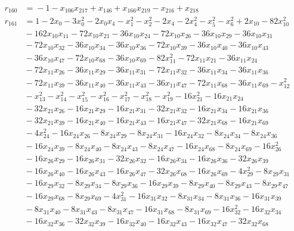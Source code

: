 \begin{align*}
r_{160} &={}-1 -x_{106}x_{217} +x_{146} +x_{166}x_{219} -x_{216} +x_{218} \\
r_{161} &={}1 -2x_{0} -3x_{0}^{2} -2x_{0}x_{4} -x_{1}^{2} -x_{2}^{2} -2x_{4} -2x_{4}^{2} -x_{5}^{2} -x_{6}^{2} +2x_{10} -82x_{10}^{2} \\
&{}-162x_{10}x_{11} -72x_{10}x_{21} -36x_{10}x_{24} -72x_{10}x_{26} -36x_{10}x_{29} -36x_{10}x_{31} \\
&{}-72x_{10}x_{32} -36x_{10}x_{34} -36x_{10}x_{36} -72x_{10}x_{39} -36x_{10}x_{40} -36x_{10}x_{43} \\
&{}-36x_{10}x_{47} -72x_{10}x_{68} -36x_{10}x_{69} -82x_{11}^{2} -72x_{11}x_{21} -36x_{11}x_{24} \\
&{}-72x_{11}x_{26} -36x_{11}x_{29} -36x_{11}x_{31} -72x_{11}x_{32} -36x_{11}x_{34} -36x_{11}x_{36} \\
&{}-72x_{11}x_{39} -36x_{11}x_{40} -36x_{11}x_{43} -36x_{11}x_{47} -72x_{11}x_{68} -36x_{11}x_{69} -x_{12}^{2} \\
&{}-x_{13}^{2} -x_{14}^{2} -x_{15}^{2} -x_{16}^{2} -x_{17}^{2} -x_{18}^{2} -x_{19}^{2} -16x_{21}^{2} -16x_{21}x_{24} \\
&{}-32x_{21}x_{26} -16x_{21}x_{29} -16x_{21}x_{31} -32x_{21}x_{32} -16x_{21}x_{34} -16x_{21}x_{36} \\
&{}-32x_{21}x_{39} -16x_{21}x_{40} -16x_{21}x_{43} -16x_{21}x_{47} -32x_{21}x_{68} -16x_{21}x_{69} \\
&{}-4x_{24}^{2} -16x_{24}x_{26} -8x_{24}x_{29} -8x_{24}x_{31} -16x_{24}x_{32} -8x_{24}x_{34} -8x_{24}x_{36} \\
&{}-16x_{24}x_{39} -8x_{24}x_{40} -8x_{24}x_{43} -8x_{24}x_{47} -16x_{24}x_{68} -8x_{24}x_{69} -16x_{26}^{2} \\
&{}-16x_{26}x_{29} -16x_{26}x_{31} -32x_{26}x_{32} -16x_{26}x_{34} -16x_{26}x_{36} -32x_{26}x_{39} \\
&{}-16x_{26}x_{40} -16x_{26}x_{43} -16x_{26}x_{47} -32x_{26}x_{68} -16x_{26}x_{69} -4x_{29}^{2} -8x_{29}x_{31} \\
&{}-16x_{29}x_{32} -8x_{29}x_{34} -8x_{29}x_{36} -16x_{29}x_{39} -8x_{29}x_{40} -8x_{29}x_{43} -8x_{29}x_{47} \\
&{}-16x_{29}x_{68} -8x_{29}x_{69} -4x_{31}^{2} -16x_{31}x_{32} -8x_{31}x_{34} -8x_{31}x_{36} -16x_{31}x_{39} \\
&{}-8x_{31}x_{40} -8x_{31}x_{43} -8x_{31}x_{47} -16x_{31}x_{68} -8x_{31}x_{69} -16x_{32}^{2} -16x_{32}x_{34} \\
&{}-16x_{32}x_{36} -32x_{32}x_{39} -16x_{32}x_{40} -16x_{32}x_{43} -16x_{32}x_{47} -32x_{32}x_{68} \\

\end{align*}
